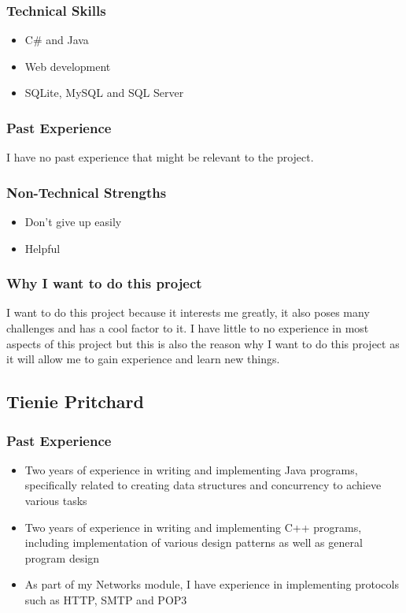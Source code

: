 \subsubsection{Technical Skills} 
	\begin{itemize}
		\item C\# and Java
		\item Web development
		\item SQLite, MySQL and SQL Server
	\end{itemize}
\subsubsection{Past Experience}
I have no past experience that might be relevant to the project. %
\subsubsection{Non-Technical Strengths}
	\begin{itemize}
		\item Don't give up easily
		\item Helpful
	\end{itemize}
\subsubsection{Why I want to do this project} 
I want to do this project because it interests me greatly, it also poses many challenges and has a cool factor to it. I have little to no experience in most aspects of this project but this is also the reason why I want to do this project as it will allow me to gain experience and learn new things. 

\pagebreak
\subsection{Tienie Pritchard}

\subsubsection{Past Experience} 
\begin{itemize}
	\item{Two years of experience in writing and implementing Java programs, specifically related to creating data structures and concurrency to achieve various tasks}
	\item{Two years of experience in writing and implementing C++ programs, including implementation of various design patterns as well as general program design}
	\item{As part of my Networks module, I have experience in implementing protocols such as HTTP, SMTP and POP3}
\end{itemize}
